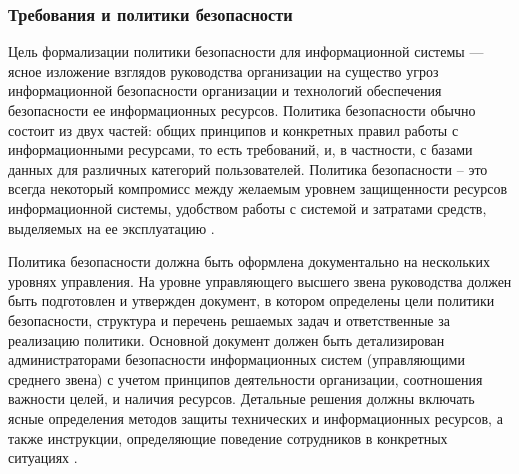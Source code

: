 \subsubsection{Требования и политики безопасности}

Цель формализации политики безопасности для информационной системы — ясное изложение взглядов руководства
организации на существо угроз информационной безопасности организации и технологий обеспечения безопасности ее
информационных ресурсов. Политика безопасности обычно состоит из двух частей: общих принципов и конкретных правил
работы с информационными ресурсами, то есть требований, и, в частности, с базами данных для различных категорий
пользователей. Политика безопасности – это всегда некоторый компромисс между желаемым уровнем защищенности ресурсов
информационной системы, удобством работы с системой и затратами средств, выделяемых на ее эксплуатацию \autocite{shveikin}.

Политика безопасности должна быть оформлена документально на нескольких уровнях управления. На уровне управляющего
высшего звена руководства должен быть подготовлен и утвержден документ, в котором определены цели политики
безопасности, структура и перечень решаемых задач и ответственные за реализацию политики. Основной документ
должен быть детализирован администраторами безопасности информационных систем (управляющими среднего звена)
с учетом принципов деятельности организации, соотношения важности целей, и наличия ресурсов. Детальные решения
должны включать ясные определения методов защиты технических и информационных ресурсов, а также инструкции,
определяющие поведение сотрудников в конкретных ситуациях \autocite{shveikin}.

